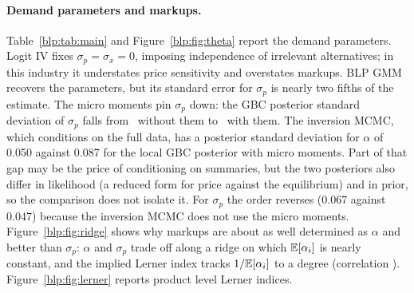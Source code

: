 \paragraph{Demand parameters and markups.} Table~\ref{blp:tab:main} and Figure~\ref{blp:fig:theta} report the demand parameters. Logit IV fixes $\sigma_p=\sigma_x=0$, imposing independence of irrelevant alternatives; in this industry it understates price sensitivity and overstates markups. BLP GMM recovers the parameters, but its standard error for $\sigma_p$ is nearly two fifths of the estimate. The micro moments
pin $\sigma_p$ down: the GBC posterior standard deviation of $\sigma_p$ falls from
\numspnomicro\ without them to \numspmicro\ with them. The inversion MCMC, which conditions on the full data, has a posterior standard deviation for $\alpha$ of 0.050 against 0.087 for the local GBC posterior with micro moments. Part of that gap may be the price of conditioning on summaries, but the two posteriors also differ in likelihood (a reduced form for price against the equilibrium) and in prior, so the comparison does not isolate it. For $\sigma_p$ the order reverses (0.067 against 0.047) because the inversion MCMC does not use the micro moments. Figure~\ref{blp:fig:ridge} shows why markups
are about as well determined as $\alpha$ and better than $\sigma_p$: $\alpha$ and $\sigma_p$ trade off along a
ridge on which $\mathbb{E}[\alpha_i]$ is nearly constant, and the implied Lerner index tracks
$1/\mathbb{E}[\alpha_i]$ to a degree (correlation \numcorrLa). Figure~\ref{blp:fig:lerner} reports product level Lerner
indices.

\begin{table}[htbp]
\centering\footnotesize\setlength{\tabcolsep}{2.5pt}
\caption{Posterior means (standard deviations) of the nonlinear demand parameters and of the
antitrust estimands obtained by plugging in parameter draws, for the Bayesian rows (GBC and the inversion MCMC). For GMM and logit the parameter columns give the point estimate and its sandwich standard error, and the derived quantities the mean (standard deviation) of Krinsky and Robb draws from the asymptotic normal approximation. $\Delta p/p$ is the
average over the four merging products; $\Delta$CS is per consumer per market in units of
\$10{,}000.}
\label{blp:tab:main}
\end{table}

